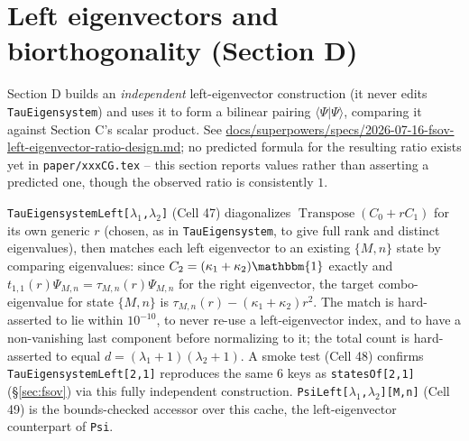 \documentclass[11pt]{article}
\begin{document}
\section{Left eigenvectors and biorthogonality (Section D)}
\label{sec:lefteig}

Section D builds an \emph{independent} left-eigenvector construction (it never edits
\texttt{TauEigensystem}) and uses it to form a bilinear pairing $\langle\Psi|\Psi\rangle$, comparing
it against Section C's scalar product. See
\url{docs/superpowers/specs/2026-07-16-fsov-left-eigenvector-ratio-design.md}; no predicted
formula for the resulting ratio exists yet in \texttt{paper/xxxCG.tex} -- this section reports
values rather than asserting a predicted one, though the observed ratio is consistently $1$.

\texttt{TauEigensystemLeft[$\lambda_1$,$\lambda_2$]} (Cell 47) diagonalizes
$\operatorname{Transpose}(C_0+rC_1)$ for its own generic $r$ (chosen, as in
\texttt{TauEigensystem}, to give full rank and distinct eigenvalues), then matches each left
eigenvector to an existing $\{M,n\}$ state by comparing eigenvalues: since $C_2=(\kappa_1+\kappa_2)
\mathbbm{1}$ exactly and $t_{1,1}(r)\Psi_{M,n}=\tau_{M,n}(r)\Psi_{M,n}$ for the right eigenvector,
the target combo-eigenvalue for state $\{M,n\}$ is $\tau_{M,n}(r)-(\kappa_1+\kappa_2)r^2$. The
match is hard-asserted to lie within $10^{-10}$, to never re-use a left-eigenvector index, and to
have a non-vanishing last component before normalizing to it; the total count is hard-asserted to
equal $d=(\lambda_1+1)(\lambda_2+1)$. A smoke test (Cell 48) confirms
\texttt{TauEigensystemLeft[2,1]} reproduces the same 6 keys as \texttt{statesOf[2,1]}
(\S\ref{sec:fsov}) via this fully independent construction. \texttt{PsiLeft[$\lambda_1$,$\lambda_2$][M,n]}
(Cell 49) is the bounds-checked accessor over this cache, the left-eigenvector counterpart of
\texttt{Psi}.
\end{document}
